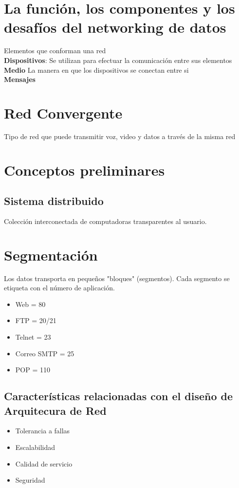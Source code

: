 \documentclass[letterpaper,12pt]{article}
\begin{document}
\begin{sloppypar}
\section{La función, los componentes y los desafíos del networking de datos}
Elementos que conforman una red
\vspace{0.3cm}\\ 
\textbf{Dispositivos}: Se utilizan para efectuar la comunicación entre sus elementos 
\vspace{0.3cm}\\ 
\textbf{Medio}
La manera en que los dispositivos se conectan entre si 
\vspace{0.3cm}\\
\textbf{Mensajes} 

\section{Red Convergente}
Tipo de red que puede transmitir voz, video y datos a través de la misma red

\section{Conceptos preliminares}
\subsection{Sistema distribuido}
Colección interconectada de computadoras transparentes al usuario.  

\section{Segmentación}
Los datos transporta en pequeños "bloques" (segmentos). Cada segmento se etiqueta con el número de aplicación.
\begin{itemize}
    \item Web = 80 
    \item FTP = 20/21 
    \item Telnet = 23
    \item Correo SMTP = 25 
    \item POP = 110 
\end{itemize}

\subsection{Características relacionadas con el diseño de Arquitecura de Red }
\begin{itemize}
    \item Tolerancia a fallas 
    \item Escalabilidad 
    \item Calidad de servicio 
    \item Seguridad
\end{itemize}


\end{sloppypar}
\end{document}
